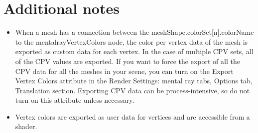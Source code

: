 \documentclass[10pt,a4paper]{article}
\begin{document}
\section*{Additional notes}
\begin{itemize}
	\item When a mesh has a connection between the meshShape.colorSet[n].colorName to the mentalrayVertexColors node, the color per vertex data of the mesh is exported as custom data for each vertex. In the case of multiple CPV sets, all of the CPV values are exported.
	If you want to force the export of all the CPV data for all the meshes in your scene, you can turn on the Export Vertex Colors attribute in the Render Settings: mental ray tabs, Options tab, Translation section. Exporting CPV data can be process-intensive, so do not turn on this attribute unless necessary.
	\item Vertex colors are exported as user data for vertices and are accessible from a shader.
\end{itemize}
\end{document}
